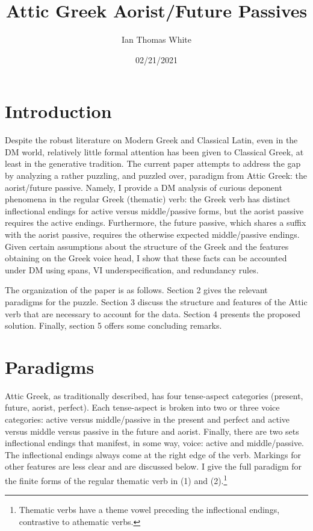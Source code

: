 \documentclass[]{ling-200b-2}
\title{Attic Greek Aorist/Future Passives}
\author{Ian Thomas White}
\date{02/21/2021}
\makeatletter
\renewcommand{\maketitle}
{
\begin{flushleft}
\textbf{{\large\@title}}
\newline
\@author
\end{flushleft}
}
\makeatother
\begin{document}
\thispagestyle{empty}
\singlespacing
\maketitle
\tableofcontents
\newpage

\section{Introduction}

Despite the robust literature on Modern Greek and Classical Latin, even in the DM world, relatively little formal attention has been given to Classical Greek, at least in the generative tradition. The current paper attempts to address the gap by analyzing a rather puzzling, and puzzled over, paradigm from Attic Greek: the aorist/future passive. Namely, I provide a DM analysis of curious deponent phenomena in the regular Greek (thematic) verb: the Greek verb has distinct inflectional endings for active versus middle/passive forms, but the aorist passive requires the active endings. Furthermore, the future passive, which shares a suffix with the aorist passive, requires the otherwise expected middle/passive endings. Given certain assumptions about the structure of the Greek and the features obtaining on the Greek voice head, I show that these facts can be accounted under DM using spans, VI underspecification, and redundancy rules.

The organization of the paper is as follows. Section 2 gives the relevant paradigms for the puzzle. Section 3 discuss the structure and features of the Attic verb that are necessary to account for the data. Section 4 presents the proposed solution. Finally, section 5 offers some concluding remarks.


\section{Paradigms}

Attic Greek, as traditionally described, has four tense-aspect categories (present, future, aorist, perfect). Each tense-aspect is broken into two or three voice categories: active versus middle/passive in the present and perfect and active versus middle versus passive in the future and aorist. Finally, there are two sets inflectional endings that manifest, in some way, voice: active and middle/passive. The inflectional endings always come at the right edge of the verb. Markings for other features are less clear and are discussed below. I give the full paradigm for the finite forms of the regular thematic verb in (1) and (2).\footnote{Thematic verbs have a theme vowel preceding the inflectional endings, contrastive to athematic verbs.}
\end{document}
